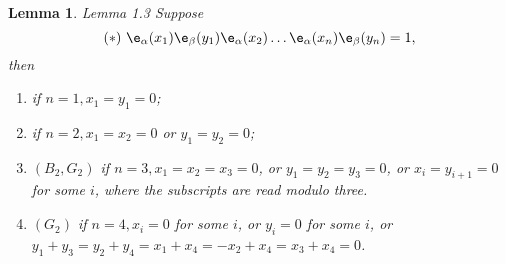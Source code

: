 \documentclass{memo-l}
\newtheorem{lemma}[theorem]{Lemma}
\theoremstyle{definition}
\theoremstyle{remark}
\numberwithin{section}{chapter}
\numberwithin{equation}{chapter}
\begin{document}
\begin{lemma}{Lemma 1.3}   Suppose 
\[
{(*)}\   
{\e}_{\alpha}(x_{1}){\e}_{\beta}(y_{1})
{\e}_{\alpha}(x_{2})\ldots {\e}_{\alpha}(x_{n})
{\e}_{\beta}(y_{n}) = 1,
\] 
then

\begin{enumerate}[label=\alph*)]
\item if $n = 1, x_{1} = y_{1} = 0$;
\item if  $n = 2, x_{1} = x_{2} = 0$ or $y_{1} = y_{2} = 0$;
\item $(B_{2}, G_{2})$ if $n = 3, x_{1} = x_{2} = x_{3} = 0$, or 
$y_{1} = y_{2} = y_{3} = 0$, 
or $x_{i} = y_{i+1} = 0$ for some $i$, where the subscripts are 
read modulo three.
\item $(G_{2})$ if $n = 4, x_{i} = 0$ for some $i$, or $y_{i} = 0$ 
for some $i$, or  
\newline
$y_{1}+y_{3} = y_{2}+y_{4} = x_{1}+x_{4} = -x_{2}+x_{4} 
= x_{3}+x_{4} = 0$.
\end{enumerate}
\end{lemma}
\end{document}
